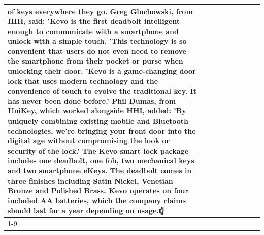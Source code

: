 \begin{table}[H]
\begin{tabular}{lllrlllll}
of keys everywhere they go. Greg Gluchowski, from HHI, said: 'Kevo is the first deadbolt intelligent enough to communicate with a smartphone and unlock with a simple touch. 'This technology is so convenient that users do not even need to remove the smartphone from their pocket or purse when unlocking their door. 'Kevo is a game-changing door lock that uses modern technology and the convenience of touch to evolve the traditional key. It has never been done before.' Phil Dumas, from UniKey, which worked alongside HHI, added: 'By uniquely combining existing mobile and Bluetooth technologies, we’re bringing your front door into the digital age without compromising the look or security of the lock.' The Kevo smart lock package includes one deadbolt, one fob, two mechanical keys and two smartphone eKeys. The deadbolt comes in three finishes including Satin Nickel, Venetian Bronze and Polished Brass. Kevo operates on four included AA batteries, which the company claims should last for a year depending on usage.ຢູ່ \\
\cline{1-9}

\end{tabular}
\end{table}
